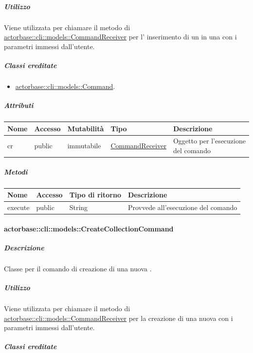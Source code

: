 \documentclass{scalatekids-article}
\begin{document}
\subparagraph{Utilizzo}

Viene utilizzata per chiamare il metodo di \hyperref[sec:actorbase::cli::models::CommandReceiver]{actorbase::cli::models::CommandReceiver} per l' inserimento di un  in una  con i parametri immessi dall'utente.

\subparagraph{Classi ereditate}

\begin{itemize}
\item \hyperref[sec:actorbase::cli::models::Command]{actorbase::cli::models::Command}.
\end{itemize}

\subparagraph{Attributi}

\begin{tabular}{| p{1cm} | p{1.5cm} | p{2cm} | p{4cm} | p{8.5cm} |}
  \hline
  Nome & Accesso & Mutabilità & Tipo & Descrizione\\
  \hline
  cr & public & immutabile & \hyperref[sec:actorbase::cli::models::CommandReceiver]{CommandReceiver} & Oggetto per l'esecuzione del comando\\
  \hline
\end{tabular}

\subparagraph{Metodi}

\begin{tabular}{| l | l | l | l |}
  \hline
  Nome & Accesso & Tipo di ritorno & Descrizione\\
  \hline
  execute & public & String & Provvede all'esecuzione del comando\\
  \hline
\end{tabular}

\paragraph{actorbase::cli::models::CreateCollectionCommand}
\label{sec:actorbase::cli::models::CreateCollectionCommand}

\subparagraph{Descrizione}

Classe per il comando di creazione di una nuova .

\subparagraph{Utilizzo}

Viene utilizzata per chiamare il metodo di
\hyperref[sec:actorbase::cli::models::CommandReceiver]{actorbase::cli::models::CommandReceiver} per la creazione di una nuova
 con i parametri immessi dall'utente.

\subparagraph{Classi ereditate}
\end{document}
